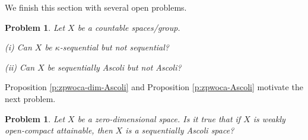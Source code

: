 \documentclass[preprint,11pt]{elsarticle}
\newtheorem{remark}[theorem]{Remark}
\newtheorem{problem}[theorem]{Problem}
\numberwithin{equation}{section}
\numberwithin{theorem}{section}
\newcommand{\w}{\omega}
\newcommand{\NN}{\mathbb{N}}
\newcommand{\IR}{\mathbb{R}}
\begin{document}



We finish this section with several open problems.

\begin{problem}
Let $X$ be a countable spaces/group.

{\rm(i)} Can $X$ be $\kappa$-sequential but not sequential?

{\rm(ii)} Can $X$ be sequentially Ascoli but not Ascoli?
\end{problem}


Proposition \ref{p:zpwoca-dim-Ascoli} and Proposition \ref{p:zpwoca-Ascoli} motivate the next problem.
\begin{problem}
Let $X$ be a zero-dimensional  space. Is it true that if $X$ is weakly open-compact attainable, then $X$ is a sequentially Ascoli space?
\end{problem}






\end{document}

